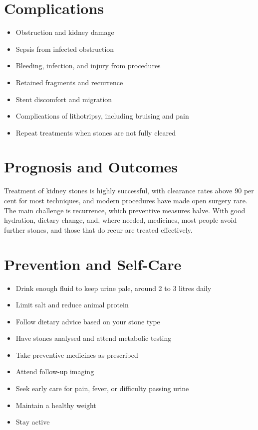 \section*{Complications}
\begin{itemize}
    \item Obstruction and kidney damage
    \item Sepsis from infected obstruction
    \item Bleeding, infection, and injury from procedures
    \item Retained fragments and recurrence
    \item Stent discomfort and migration
    \item Complications of lithotripsy, including bruising and pain
    \item Repeat treatments when stones are not fully cleared
\end{itemize}

\section*{Prognosis and Outcomes}
Treatment of kidney stones is highly successful, with clearance rates above 90 per cent for most techniques, and modern procedures have made open surgery rare. The main challenge is recurrence, which preventive measures halve. With good hydration, dietary change, and, where needed, medicines, most people avoid further stones, and those that do recur are treated effectively.

\section*{Prevention and Self-Care}
\begin{itemize}
    \item Drink enough fluid to keep urine pale, around 2 to 3 litres daily
    \item Limit salt and reduce animal protein
    \item Follow dietary advice based on your stone type
    \item Have stones analysed and attend metabolic testing
    \item Take preventive medicines as prescribed
    \item Attend follow-up imaging
    \item Seek early care for pain, fever, or difficulty passing urine
    \item Maintain a healthy weight
    \item Stay active
\end{itemize}

